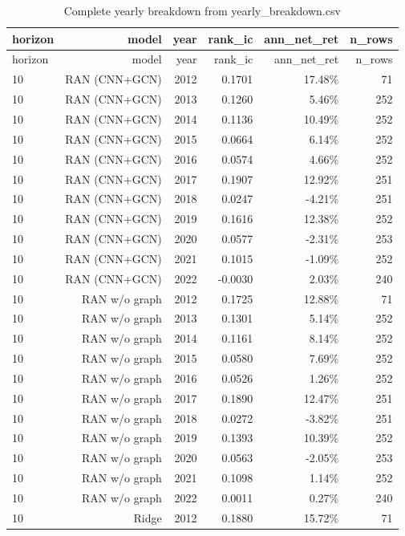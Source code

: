 \documentclass[10pt]{article}
\begin{document}
\begingroup\scriptsize\setlength{\tabcolsep}{3pt}
\begin{longtable}{lrrrrr}
\caption{Complete yearly breakdown from yearly\_breakdown.csv}\label{tab:yearlyall}\\
\toprule
horizon & model & year & rank\_ic & ann\_net\_ret & n\_rows \\
\midrule
\endfirsthead
\toprule
horizon & model & year & rank\_ic & ann\_net\_ret & n\_rows \\
\midrule
\endhead
10 & RAN (CNN+GCN) & 2012 & 0.1701 & 17.48\% & 71 \\
10 & RAN (CNN+GCN) & 2013 & 0.1260 & 5.46\% & 252 \\
10 & RAN (CNN+GCN) & 2014 & 0.1136 & 10.49\% & 252 \\
10 & RAN (CNN+GCN) & 2015 & 0.0664 & 6.14\% & 252 \\
10 & RAN (CNN+GCN) & 2016 & 0.0574 & 4.66\% & 252 \\
10 & RAN (CNN+GCN) & 2017 & 0.1907 & 12.92\% & 251 \\
10 & RAN (CNN+GCN) & 2018 & 0.0247 & -4.21\% & 251 \\
10 & RAN (CNN+GCN) & 2019 & 0.1616 & 12.38\% & 252 \\
10 & RAN (CNN+GCN) & 2020 & 0.0577 & -2.31\% & 253 \\
10 & RAN (CNN+GCN) & 2021 & 0.1015 & -1.09\% & 252 \\
10 & RAN (CNN+GCN) & 2022 & -0.0030 & 2.03\% & 240 \\
10 & RAN w/o graph & 2012 & 0.1725 & 12.88\% & 71 \\
10 & RAN w/o graph & 2013 & 0.1301 & 5.14\% & 252 \\
10 & RAN w/o graph & 2014 & 0.1161 & 8.14\% & 252 \\
10 & RAN w/o graph & 2015 & 0.0580 & 7.69\% & 252 \\
10 & RAN w/o graph & 2016 & 0.0526 & 1.26\% & 252 \\
10 & RAN w/o graph & 2017 & 0.1890 & 12.47\% & 251 \\
10 & RAN w/o graph & 2018 & 0.0272 & -3.82\% & 251 \\
10 & RAN w/o graph & 2019 & 0.1393 & 10.39\% & 252 \\
10 & RAN w/o graph & 2020 & 0.0563 & -2.05\% & 253 \\
10 & RAN w/o graph & 2021 & 0.1098 & 1.14\% & 252 \\
10 & RAN w/o graph & 2022 & 0.0011 & 0.27\% & 240 \\
10 & Ridge & 2012 & 0.1880 & 15.72\% & 71 \\

\end{longtable}
\end{document}
